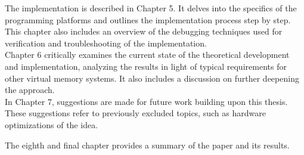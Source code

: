 The implementation is described in Chapter 5. It delves into the specifics of the programming platforms
and outlines the implementation process step by step. This chapter also includes an overview of the debugging
techniques used for verification and troubleshooting of the implementation.\\

Chapter 6 critically examines the current state of the theoretical development and implementation,
analyzing the results in light of typical requirements for other virtual memory systems.
It also includes a discussion on further deepening the approach.\\
In Chapter 7, suggestions are made for future work building upon this thesis. These suggestions refer
to previously excluded topics, such as hardware optimizations of the idea.

The eighth and final chapter provides a summary of the paper and its results.\\









